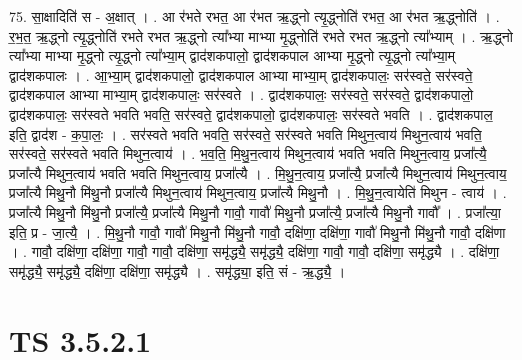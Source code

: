 \documentclass[17pt]{extarticle}
\begin{document}
75. सा॒क्षादिति॑ स - अ॒क्षात् । . आ र॑भते रभत॒ आ र॑भत ऋ॒द्ध्नो त्यृ॒द्ध्नोति॑ रभत॒ आ र॑भत ऋ॒द्ध्नोति॑ । . र॒भ॒त॒ ऋ॒द्ध्नो त्यृ॒द्ध्नोति॑ रभते रभत ऋ॒द्ध्नो त्या᳚भ्या माभ्या मृ॒द्ध्नोति॑ रभते रभत 
ऋ॒द्ध्नो त्या᳚भ्याम् । . ऋ॒द्ध्नो त्या᳚भ्या माभ्या मृ॒द्ध्नो त्यृ॒द्ध्नो त्या᳚भ्या॒म् द्वाद॑शकपालो॒ द्वाद॑शकपाल 
आभ्या मृ॒द्ध्नो त्यृ॒द्ध्नो त्या᳚भ्या॒म् द्वाद॑शकपालः । . आ॒भ्या॒म् द्वाद॑शकपालो॒ द्वाद॑शकपाल आभ्या माभ्या॒म् द्वाद॑शकपालः॒ सर॑स्वते॒ सर॑स्वते॒ द्वाद॑शकपाल आभ्या माभ्या॒म् द्वाद॑शकपालः॒ सर॑स्वते । . द्वाद॑शकपालः॒ सर॑स्वते॒ सर॑स्वते॒ द्वाद॑शकपालो॒ द्वाद॑शकपालः॒ सर॑स्वते भवति भवति॒ सर॑स्वते॒ द्वाद॑शकपालो॒ द्वाद॑शकपालः॒ सर॑स्वते भवति । . द्वाद॑शकपाल॒ इति॒ द्वाद॑श - क॒पा॒लः॒ । . सर॑स्वते भवति भवति॒ सर॑स्वते॒ सर॑स्वते भवति मिथुन॒त्वाय॑ मिथुन॒त्वाय॑ भवति॒ सर॑स्वते॒ सर॑स्वते भवति मिथुन॒त्वाय॑ । . भ॒व॒ति॒ मि॒थु॒न॒त्वाय॑ मिथुन॒त्वाय॑ भवति भवति मिथुन॒त्वाय॒ प्रजा᳚त्यै॒ प्रजा᳚त्यै मिथुन॒त्वाय॑ भवति भवति मिथुन॒त्वाय॒ प्रजा᳚त्यै । . मि॒थु॒न॒त्वाय॒ प्रजा᳚त्यै॒ प्रजा᳚त्यै मिथुन॒त्वाय॑ मिथुन॒त्वाय॒ प्रजा᳚त्यै मिथु॒नौ मि॑थु॒नौ प्रजा᳚त्यै मिथुन॒त्वाय॑ मिथुन॒त्वाय॒ प्रजा᳚त्यै मिथु॒नौ । . मि॒थु॒न॒त्वायेति॑ मिथुन - त्वाय॑ । . प्रजा᳚त्यै मिथु॒नौ मि॑थु॒नौ प्रजा᳚त्यै॒ प्रजा᳚त्यै मिथु॒नौ गावौ॒ गावौ॑ मिथु॒नौ प्रजा᳚त्यै॒ प्रजा᳚त्यै मिथु॒नौ गावौ᳚ । . प्रजा᳚त्या॒ इति॒ प्र - जा॒त्यै॒ । . मि॒थु॒नौ गावौ॒ गावौ॑ मिथु॒नौ मि॑थु॒नौ गावौ॒ दक्षि॑णा॒ दक्षि॑णा॒ गावौ॑ मिथु॒नौ मि॑थु॒नौ गावौ॒ दक्षि॑णा । . गावौ॒ दक्षि॑णा॒ दक्षि॑णा॒ गावौ॒ गावौ॒ दक्षि॑णा॒ समृ॑द्ध्यै॒ समृ॑द्ध्यै॒ दक्षि॑णा॒ गावौ॒ गावौ॒ दक्षि॑णा॒ समृ॑द्ध्यै । . दक्षि॑णा॒ समृ॑द्ध्यै॒ समृ॑द्ध्यै॒ दक्षि॑णा॒ दक्षि॑णा॒ समृ॑द्ध्यै । . समृ॑द्ध्या॒ इति॒ सं - ऋ॒द्ध्यै॒ । \newline
\pagebreak
{}

\section{ TS 3.5.2.1 }
\end{document}
